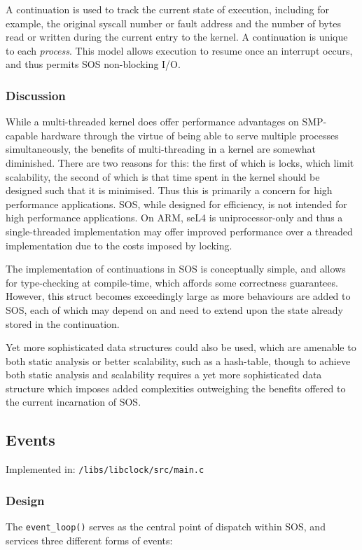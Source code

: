 \documentclass[a4paper,12pt]{article}
\begin{document}
A continuation is used to track the current state of execution, including for
example, the original syscall number or fault address and the number of bytes
read or written during the current entry to the kernel.  A continuation is
unique to each \emph{process}.  This model allows execution to resume once an
interrupt occurs, and thus permits SOS non-blocking I/O.

\subsubsection{Discussion}
While a multi-threaded kernel does offer performance advantages on SMP-capable
hardware through the virtue of being able to serve multiple processes
simultaneously, the benefits of multi-threading in a kernel are somewhat
diminished.  There are two reasons for this: the first of which is locks,
which limit scalability, the second of which is that time spent in the kernel
should be designed such that it is minimised.  Thus this is primarily a
concern for high performance applications.  SOS, while designed for
efficiency, is not intended for high performance applications.  On ARM, seL4
is uniprocessor-only and thus a single-threaded implementation may offer
improved performance over a threaded implementation due to the costs imposed
by locking.

The implementation of continuations in SOS is conceptually simple, and allows
for type-checking at compile-time, which affords some correctness guarantees.
However, this struct becomes exceedingly large as more behaviours are added to
SOS, each of which may depend on and need to extend upon the state already
stored in the continuation.

Yet more sophisticated data structures could also be used, which are amenable
to both static analysis or better scalability, such as a hash-table, though to
achieve both static analysis and scalability requires a yet more sophisticated
data structure which imposes added complexities outweighing the benefits
offered to the current incarnation of SOS.

\subsection{Events}
Implemented in: \texttt{/libs/libclock/src/main.c}

\subsubsection{Design}
The \texttt{event\_loop()} serves as the central point of dispatch within SOS, and
services three different forms of events:
\end{document}
